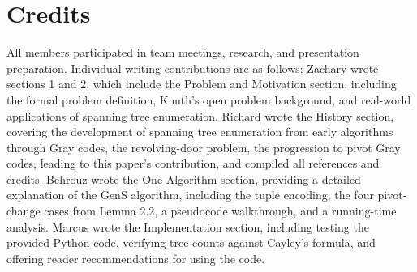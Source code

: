 \documentclass{article}
\begin{document}




\appendix

\section{Credits}


All members participated in team meetings, research, and presentation preparation. Individual writing contributions are as follows: Zachary wrote sections 1 and 2, which include the Problem and Motivation section, including the formal problem definition, Knuth's open problem background, and real-world applications of spanning tree enumeration. Richard wrote the History section, covering the development of spanning tree enumeration from early algorithms through Gray codes, the revolving-door problem, the progression to pivot Gray codes, leading to this paper's contribution, and compiled all references and credits. Behrouz wrote the One Algorithm section, providing a detailed explanation of the GenS algorithm, including the tuple encoding, the four pivot-change cases from Lemma 2.2, a pseudocode walkthrough, and a running-time analysis. Marcus wrote the Implementation section, including testing the provided Python code, verifying tree counts against Cayley's formula, and offering reader recommendations for using the code.
\end{document}
